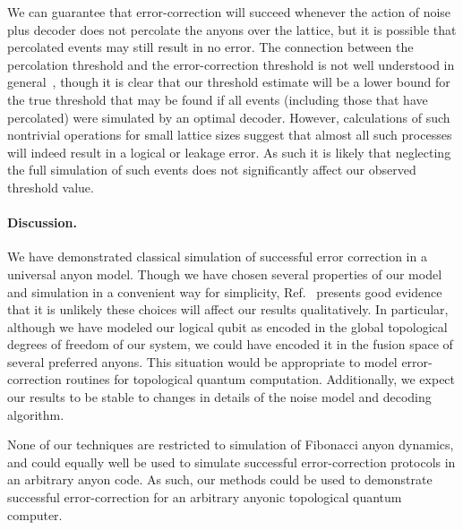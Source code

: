 \documentclass[aps, prl, letterpaper, twocolumn, superscriptaddress, notitlepage, 10pt]{revtex4}
\begin{document}
We can guarantee that error-correction will succeed whenever
the action of noise plus decoder 
does not percolate the anyons over the lattice,
but it is possible that percolated events may still result in no error. 
The connection between the percolation threshold and the error-correction threshold 
is not well understood in general~\cite{Hastings2014}, though it is clear 
that our threshold estimate will be a lower bound for 
the true threshold that may be found if all events 
(including those that have percolated) were simulated by an optimal decoder. 
However, calculations of such nontrivial operations for small lattice sizes suggest that almost all such 
processes will indeed result in a logical or leakage error.
As such it is likely that neglecting the full simulation of 
such events does not significantly affect our observed threshold value.

\paragraph{Discussion.}

We have demonstrated classical simulation of successful error correction in a universal anyon model. 
Though we have chosen several properties of our model and 
simulation in a convenient way for simplicity,
Ref.~\cite{Brell2013} presents good evidence that it is
unlikely these choices will affect our results qualitatively.
In particular, although we have modeled our logical qubit as 
encoded in the global topological degrees of freedom of our 
system, we could have encoded it in the fusion space of several preferred anyons. 
This situation would be appropriate to model error-correction routines for topological quantum computation. 
Additionally, we expect our results to be stable to changes in details of the noise model and decoding algorithm.

None of our techniques are restricted to simulation of Fibonacci anyon dynamics, and could 
equally well be used to simulate successful error-correction protocols in an arbitrary anyon code. 
As such, our methods could be used to demonstrate successful 
error-correction for an arbitrary anyonic topological quantum computer.
\end{document}
